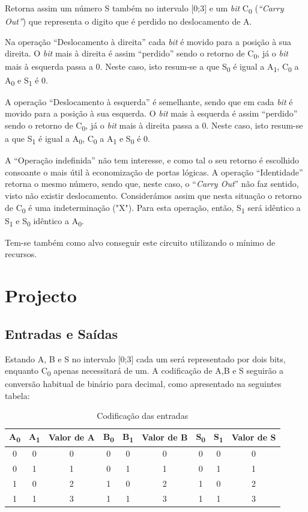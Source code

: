 \documentclass[a4paper,12pt]{article}
\begin{document}
Retorna assim um número S também no intervalo [0;3] e um {\it bit} C\textsubscript{0} ({\it ``Carry Out''}) que representa o digito que é perdido no deslocamento de A. 
\par
Na operação ``Deslocamento à direita'' cada {\it bit} é movido para a posição à sua direita. O {\it bit} mais à direita é assim ``perdido'' sendo o retorno de C\textsubscript{0}, já o {\it bit} mais à esquerda passa a 0. Neste caso, isto resum-se a que S\textsubscript{0} é igual a A\textsubscript{1}, C\textsubscript{0} a A\textsubscript{0} e S\textsubscript{1} é 0.
\par
A operação ``Deslocamento à esquerda'' é semelhante, sendo que em cada {\it bit} é movido para a posição à sua esquerda. O {\it bit} mais à esquerda é assim ``perdido'' sendo o retorno de C\textsubscript{0}, já o {\it bit} mais à direita passa a 0. Neste caso, isto resum-se a que S\textsubscript{1} é igual a A\textsubscript{0}, C\textsubscript{0} a A\textsubscript{1} e S\textsubscript{0} é 0.
\par
A ``Operação indefinida'' não tem interesse, e como tal o seu retorno é escolhido consoante o mais útil à economização de portas lógicas. 
A operação ``Identidade'' retorna o mesmo número, sendo que, neste caso, o ``{\it Carry Out}'' não faz sentido, visto não existir deslocamento. Considerámos assim que nesta situação o retorno de C\textsubscript{0} é uma indeterminação ("X"). Para esta operação, então, S\textsubscript{1} será idêntico a S\textsubscript{1} e S\textsubscript{0} idêntico a A\textsubscript{0}.
\par

Tem-se também como alvo conseguir este circuito utilizando o mínimo de recursos.

\section{Projecto}

\subsection{Entradas e Saídas}
Estando A, B e S no intervalo [0;3] cada um será representado por dois bits, enquanto C\textsubscript{0} apenas necessitará de um. A codificação de A,B e S seguirão a conversão habitual de binário para decimal, como apresentado na seguintes tabela:
 

\begin{table}[h]
\centering
\begin{tabular}{|| c | c | c || c | c | c || c | c | c ||}
\hline
A\textsubscript{0} & A\textsubscript{1} & Valor de A & B\textsubscript{0} & B\textsubscript{1} & Valor de B & S\textsubscript{0} & S\textsubscript{1} & Valor de S \\ \hline
0 & 0 & 0 & 0 & 0 & 0 & 0 & 0 & 0  \\
0 & 1 & 1 & 0 & 1 & 1 & 0 & 1 & 1 \\
1 & 0 & 2 & 1 & 0 & 2 & 1 & 0 & 2 \\
1 & 1 & 3 & 1 & 1 & 3 & 1 & 1 & 3 \\ \hline
\end{tabular}
\caption{Codificação das entradas} %
\end{table}
\end{document}
